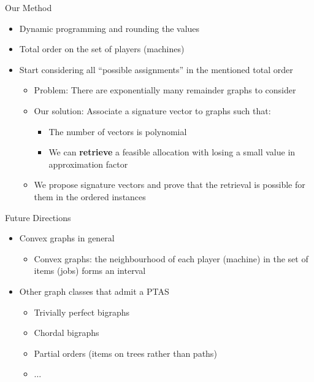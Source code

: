 \begin{frame}[t]{Our Method}
    \begin{itemize}
        \item<2-> Dynamic programming and rounding the values 
        \item<3-> Total order on the set of players (machines)
        \item<4-> Start considering all ``possible assignments'' in the mentioned total order
            \begin{itemize}
                \item<5-> Problem: There are exponentially many \alert{remainder} graphs to consider
                \item<6-> Our solution: Associate a signature vector to graphs such that:
                    \begin{itemize}
                        \item<7-> The number of vectors is polynomial
                        \item<8-> We can \textbf{retrieve} a feasible allocation with losing a small value in approximation factor
                    \end{itemize}
                \item<9-> We \alert{propose} signature vectors and \alert{prove} that the retrieval is possible for them in the ordered instances
            \end{itemize}
    \end{itemize}
\end{frame}

\begin{frame}[t]{Future Directions}

	\begin{itemize}
    	\item<1-> Convex graphs in general 
    	    \begin{itemize}
    	        \item<2-> Convex graphs: the neighbourhood of each player (machine) in the set of items (jobs) forms an interval
    	    \end{itemize}
        \item<3-> Other graph classes that admit a PTAS
        	\begin{itemize}
            	\item<4-> Trivially perfect bigraphs
                \item<5-> Chordal bigraphs
                \item<6-> Partial orders (items on trees rather than paths)
                \item<7-> $\ldots$
            \end{itemize}
    \end{itemize}
\end{frame}

